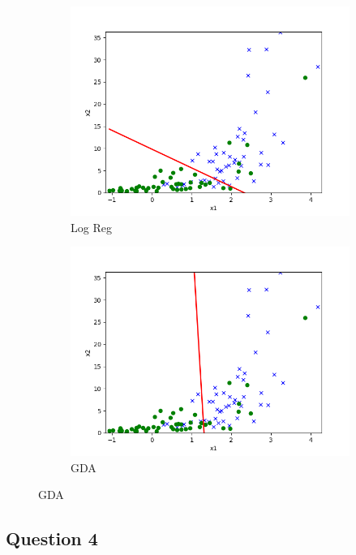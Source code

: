 \documentclass{article}
\begin{document}
\begin{figure}[h]
	\centering
	\begin{subfigure}{.49\textwidth}
		\centering
		\includegraphics[width=\textwidth]{src/linearclass/ds1/logreg_pred_1.txt.png}
		\caption{Log Reg}
		\label{fig:set one LR}
	\end{subfigure}
	\hfill
	\begin{subfigure}{.49\textwidth}
		\centering
		\includegraphics[width=\textwidth]{src/linearclass/ds1/gda_pred_1.txt.png}
		\caption{GDA}
		\label{fig:set one GDA}
	\end{subfigure}
\end{figure}


\subsection{Question 4}
\end{document}
